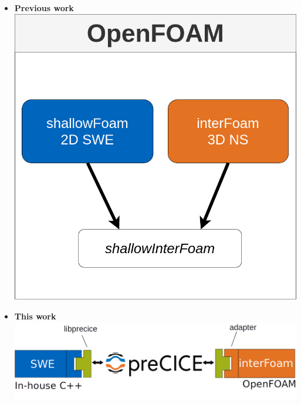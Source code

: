 
\begin{frame}
\begin{minipage}{0.3\textwidth}
\begin{itemize}
\item<1->[] {\Large \textbf{Previous work}}\\[1.5cm]
\includegraphics[width=1\textwidth]{Resources/Images/Mintgenwork2.png}
\end{itemize}
\end{minipage}
\hspace{1.5cm}
\begin{minipage}{0.5\textwidth}
\vspace{-2.2cm}
\begin{itemize}
\item<2->[] {\Large \textbf{This work}}\\[2.8cm]
\includegraphics[width=1.2\textwidth]{Resources/Images/pash2.png}
\end{itemize}
\end{minipage}
\end{frame}
 
 
 

